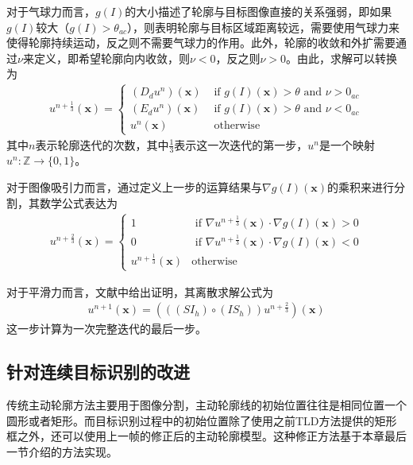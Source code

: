 对于气球力而言，$g(I)$的大小描述了轮廓与目标图像直接的关系强弱，即如果$g(I)$较大（$g(I)>\theta_{ac}$），则表明轮廓与目标区域距离较远，需要使用气球力来使得轮廓持续运动，反之则不需要气球力的作用。此外，轮廓的收敛和外扩需要通过$\nu$来定义，即希望轮廓向内收敛，则$\nu<0$，反之则$\nu>0$。由此，求解可以转换为
\begin{align}
u^{n+\frac{1}{3}}(\mathbf{x})=\left\{ \begin{array}{ll}
(D_du^n)(\mathbf{x}) &\mbox{ if $g(I)(\mathbf{x})>\theta$ and $\nu>0_{ac}$} \\
(E_du^n)(\mathbf{x}) &\mbox{ if $g(I)(\mathbf{x})>\theta$ and $\nu<0_{ac}$} \\
u^{n}(\mathbf{x}) &\mbox{ otherwise}
\end{array} \right.
\end{align}
其中$n$表示轮廓迭代的次数，其中$\frac{1}{3}$表示这一次迭代的第一步，$u^n$是一个映射$u^n:\mathbb{Z} \rightarrow \{0, 1\}$。

对于图像吸引力而言，通过定义上一步的运算结果与$ \nabla g(I)(\mathbf{x}) $的乘积来进行分割，其数学公式表达为
\begin{align}
u^{n+\frac{2}{3}}(\mathbf{x})=\left\{ \begin{array}{ll}
1 &\mbox{ if $\nabla u^{n+\frac{1}{3}}(\mathbf{x}) \cdot \nabla g(I)(\mathbf{x}) > 0$} \\
0&\mbox{ if $\nabla u^{n+\frac{1}{3}}(\mathbf{x}) \cdot \nabla g(I)(\mathbf{x}) < 0$} \\
u^{n+\frac{1}{3}}(\mathbf{x}) &\mbox{otherwise}
\end{array} \right.
\end{align}

对于平滑力而言，文献中给出证明，其离散求解公式为
\begin{align}
u^{n+1} (\mathbf{x}) = (((SI_h) \circ (IS_h)) u^{n+\frac{2}{3}})(\mathbf{x})
\end{align}
这一步计算为一次完整迭代的最后一步。

\subsection{针对连续目标识别的改进}
传统主动轮廓方法主要用于图像分割，主动轮廓线的初始位置往往是相同位置一个圆形或者矩形。而目标识别过程中的初始位置除了使用之前TLD方法提供的矩形框之外，还可以使用上一帧的修正后的主动轮廓模型。这种修正方法基于本章最后一节介绍的方法实现。

